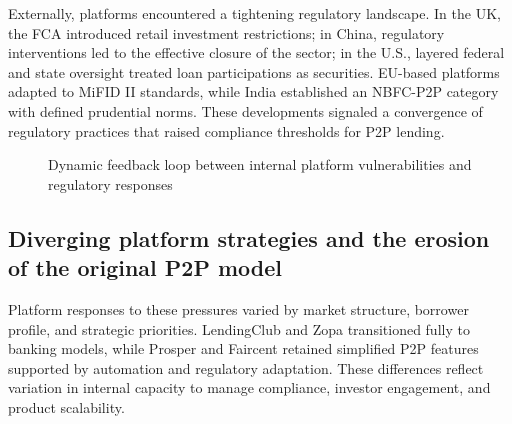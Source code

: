 \documentclass[pdflatex,sn-apa]{sn-jnl}%
\theoremstyle{thmstyleone}%
\theoremstyle{thmstyletwo}%
\theoremstyle{thmstylethree}%
\begin{document}
Externally, platforms encountered a tightening regulatory landscape. In the UK, the FCA introduced retail investment restrictions; in China, regulatory interventions led to the effective closure of the sector; in the U.S., layered federal and state oversight treated loan participations as securities. EU-based platforms adapted to MiFID II standards, while India established an NBFC-P2P category with defined prudential norms. These developments signaled a convergence of regulatory practices that raised compliance thresholds for P2P lending.

\begin{figure}[H]
    \centering
    \caption{Dynamic feedback loop between internal platform vulnerabilities and regulatory responses}
    \label{fig:feedback_loop}
\end{figure}



\subsection{Diverging platform strategies and the erosion of the original P2P model}
Platform responses to these pressures varied by market structure, borrower profile, and strategic priorities. LendingClub and Zopa transitioned fully to banking models, while Prosper and Faircent retained simplified P2P features supported by automation and regulatory adaptation. These differences reflect variation in internal capacity to manage compliance, investor engagement, and product scalability.
\end{document}
